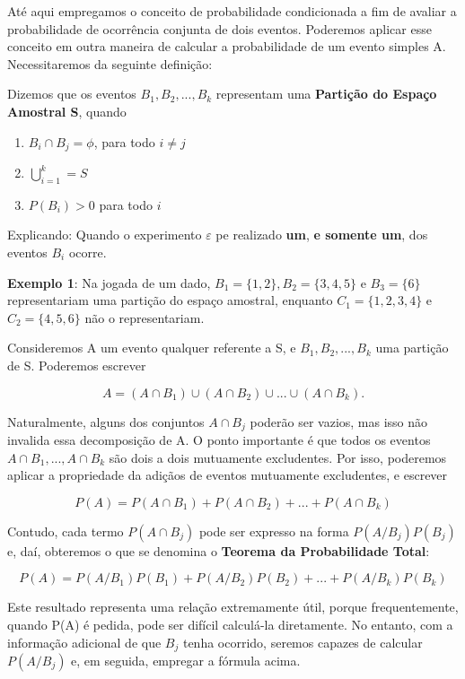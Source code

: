 Até aqui empregamos o conceito de probabilidade condicionada a fim
de avaliar a probabilidade de ocorrência conjunta de dois eventos.
Poderemos aplicar esse conceito em outra maneira de calcular a
probabilidade de um evento simples A. Necessitaremos da seguinte
definição:\vskip0.3cm


Dizemos que os eventos $B_{1},B_{2},...,B_{k}$ representam uma
\textbf{Partição do Espaço Amostral S}, quando


\begin{enumerate}
    \item $B_{i} \cap B_{j}=\phi$, para todo $i\neq j$
    \item $\bigcup^{k}_{i=1}=S$
    \item $P(B_{i})>0$ para todo $i$
\end{enumerate}

Explicando: Quando o experimento $\varepsilon$ pe realizado
\textbf{um}, \textbf{e somente um}, dos eventos $B_{i}$
ocorre.\vskip0.3cm

\textbf{Exemplo 1}: Na jogada de um dado,
$B_{1}=\{1,2\},B_{2}=\{3,4,5 \}$ e $B_{3}=\{6\}$ representariam
uma partição do espaço amostral, enquanto $C_{1}=\{1,2,3,4\}$ e
$C_{2}=\{4,5,6 \}$ não o representariam.\vskip0.3cm

Consideremos A um evento qualquer referente a S, e
$B_{1},B_{2},...,B_{k}$ uma partição de S. Poderemos escrever

$$
A = (A \cap B_{1}) \cup (A \cap B_{2}) \cup ... \cup (A \cap
B_{k}).
$$

Naturalmente, alguns dos conjuntos $A \cap B_{j}$ poderão ser
vazios, mas isso não invalida essa decomposição de A. O ponto
importante é que todos os eventos $A \cap B_{1},...,A \cap B_{k}$
são dois a dois mutuamente excludentes. Por isso, poderemos
aplicar a propriedade da adiçãos de eventos mutuamente
excludentes, e escrever


$$
P(A)=P(A\cap B_{1})+P(A\cap B_{2})+...+P(A\cap B_{k})
$$

Contudo, cada termo $P(A\cap B_{j})$ pode ser expresso na forma
$P(A/B_{j})P(B_{j})$ e, daí, obteremos o que se denomina o
\textbf{Teorema da Probabilidade Total}:

\begin{equation}\label{}
P(A)=P(A/B_{1})P(B_{1})+P(A/B_{2})P(B_{2})+...+P(A/B_{k})P(B_{k})
\end{equation}

Este resultado representa uma relação extremamente útil, porque
frequentemente, quando P(A) é pedida, pode ser difícil calculá-la
diretamente. No entanto, com a informação adicional de que $B_{j}$
tenha ocorrido, seremos capazes de calcular $P(A/B_{j})$ e, em
seguida, empregar a fórmula acima.



